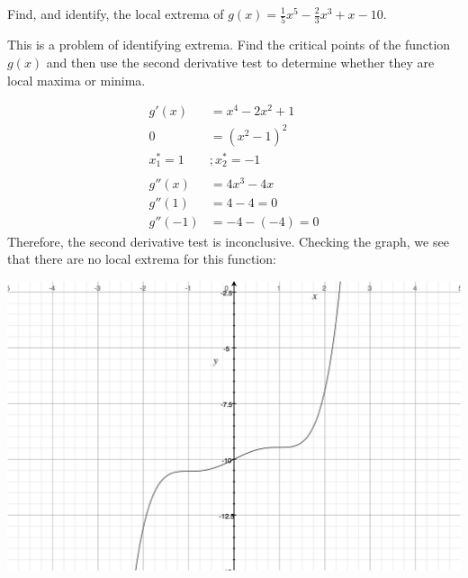 \documentclass{ximera}
\author{Emma Smith Zbarsky}
\begin{document}
\begin{exercise}

Find, and identify, the local extrema of
$g(x) = \frac{1}{5}x^5-\frac{2}{3}x^3+x-10.$


\begin{hint}
This is a problem of identifying extrema. Find the critical points of
the function $g(x)$ and then use the second derivative test to determine
whether they are local maxima or minima.
\end{hint}


\begin{hint}
\begin{align*}
g'(x) &= x^4-2x^2+1 \\
0 &= (x^2-1)^2 \\
x^*_1 = 1&; x^*_2 = -1 \\
& \\
g''(x) &= 4x^3-4x \\
g''(1) &= 4-4 = 0 \\
g''(-1) &= -4-(-4) = 0 
\end{align*} Therefore, the second derivative test is inconclusive.
Checking the graph, we see that there are no local extrema for this
function: 

\begin{image}\includegraphics[width=.5\textwidth]{extrema-none-graph.jpg}\end{image}
\end{hint}


\begin{multipleChoice}
\end{multipleChoice}
\end{exercise}
\end{document}
